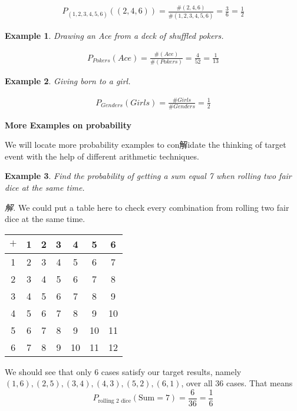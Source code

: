 \documentclass[12pt]{article}
\newtheorem{example}{Example}
\begin{document}
    \begin{align*}
        P_{(1,2,3,4,5,6)}((2,4,6))=\frac{\#(2,4,6)}{\#(1,2,3,4,5,6)}=\frac{3}{6}=\frac{1}{2}
    \end{align*}

    \begin{example}
        Drawing an Ace from a deck of shuffled pokers.
    \end{example}

    \begin{align*}
        P_{Pokers}(Ace)=\frac{\#(Ace)}{\#(Pokers)}=\frac{4}{52}=\frac{1}{13}
    \end{align*}

    \begin{example}
        Giving born to a girl.
    \end{example}

    \begin{align*}
        P_{Genders}(Girls)=\frac{\#Girls}{\#Genders}=\frac{1}{2}
    \end{align*}

    \begin{center}
        \textbf{More Examples on probability}
    \end{center}

    We will locate more probability examples to con解idate the thinking of target event with the help of different arithmetic techniques.

    \begin{example}
        Find the probability of getting a sum equal 7 when rolling two fair dice at the same time.
    \end{example}

    \textit{ 解.} We could put a table here to check every combination from rolling two fair dice at the same time.
    \begin{center}
        \begin{tabular}{c||c|c|c|c|c|c}
            $+$&1&2&3&4&5&6\\
            \hline
            \hline
            1&2&3&4&5&6&7\\
            \hline
            2&3&4&5&6&7&8\\
            \hline
            3&4&5&6&7&8&9\\
            \hline
            4&5&6&7&8&9&10\\
            \hline
            5&6&7&8&9&10&11\\
            \hline
            6&7&8&9&10&11&12\\
        \end{tabular}
    \end{center} 
    We should see that only 6 cases satisfy our target results, namely $(1,6),(2,5),(3,4),(4,3),(5,2),(6,1)$, over all 36 cases. That means $$P_{\textrm{rolling 2 dice}}(\textrm{Sum}=7)=\frac{6}{36}=\frac{1}{6}$$
\end{document}
